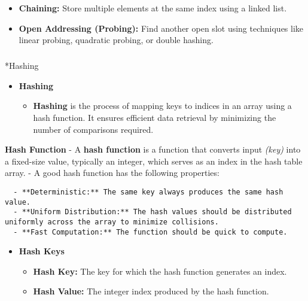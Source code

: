 \documentclass[
  letterpaper,
  DIV=11,
  numbers=noendperiod]{scrreprt}
\makeatletter
\let\oldsubparagraph\subparagraph
\renewcommand{\subparagraph}{
    \@ifstar
      \xxxSubParagraphStar
      \xxxSubParagraphNoStar
  }
\newcommand{\xxxSubParagraphStar}[1]{\oldsubparagraph*{#1}\mbox{}}
\newcommand{\xxxSubParagraphNoStar}[1]{\oldsubparagraph{#1}\mbox{}}
\providecommand{\tightlist}{%
  \setlength{\itemsep}{0pt}\setlength{\parskip}{0pt}}
\makeatother
\begin{document}
\begin{tcolorbox}[enhanced jigsaw, colframe=quarto-callout-note-color-frame, toprule=.15mm, bottomrule=.15mm, rightrule=.15mm, colback=white, breakable, arc=.35mm, opacityback=0, left=2mm, leftrule=.75mm]
\begin{itemize}
  \begin{itemize}
  \tightlist
  \item
    \textbf{Chaining:} Store multiple elements at the same index using a
    linked list.
  \item
    \textbf{Open Addressing (Probing):} Find another open slot using
    techniques like linear probing, quadratic probing, or double
    hashing.
  \end{itemize}
\end{itemize}

\subparagraph*{Hashing}\label{hashing}

\begin{itemize}
\item
  \textbf{Hashing}

  \begin{itemize}
  \tightlist
  \item
    \textbf{Hashing} is the process of mapping keys to indices in an
    array using a hash function. It ensures efficient data retrieval by
    minimizing the number of comparisons required.
  \end{itemize}
\end{itemize}

\textbf{Hash Function} - A \textbf{hash function} is a function that
converts input \emph{(key)} into a fixed-size value, typically an
integer, which serves as an index in the hash table array. - A good hash
function has the following properties:

\begin{verbatim}
  - **Deterministic:** The same key always produces the same hash value.
  - **Uniform Distribution:** The hash values should be distributed uniformly across the array to minimize collisions.
  - **Fast Computation:** The function should be quick to compute.
\end{verbatim}

\begin{itemize}
\item
  \textbf{Hash Keys}

  \begin{itemize}
  \tightlist
  \item
    \textbf{Hash Key:} The key for which the hash function generates an
    index.
  \item
    \textbf{Hash Value:} The integer index produced by the hash
    function.
  \end{itemize}
\end{itemize}


\end{tcolorbox}
\end{document}
